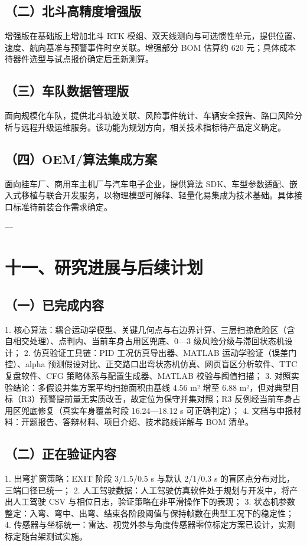 \documentclass[UTF8,11pt]{ctexart}
\begin{document}
\subsection*{（二）北斗高精度增强版}
增强版在基础版上增加北斗 RTK 模组、双天线测向与可选惯性单元，提供位置、速度、航向基准与预警事件时空关联。增强部分 BOM 估算约 620 元；具体成本待器件选型与试点报价确定后重新测算。

\subsection*{（三）车队数据管理版}
面向规模化车队，提供北斗轨迹关联、风险事件统计、车辆安全报告、路口风险分析与远程升级运维服务。该功能为规划方向，相关技术指标待产品定义确定。

\subsection*{（四）OEM/算法集成方案}
面向挂车厂、商用车主机厂与汽车电子企业，提供算法 SDK、车型参数适配、嵌入式移植与联合开发服务，以物理模型可解释、轻量化易集成为技术基础。具体接口标准待前装合作需求确定。

---

\section*{十一、研究进展与后续计划}
\subsection*{（一）已完成内容}
1. 核心算法：耦合运动学模型、关键几何点与右边界计算、三层扫掠危险区（含自相交处理）、点判内、当前车身占用区兜底、0—3 级风险分级与滞回状态机设计； 2. 仿真验证工具链：PID 工况仿真导出器、MATLAB 运动学验证（误差门控）、alpha 预测假设对比、正交路口出弯状态机仿真、网页盲区分析软件、TTC 复盘软件、CFG 策略体系与配置生成器、MATLAB 校验与阈值扫描； 3. 对照实验结论：多假设并集方案平均扫掠面积由基线 4.56 m² 增至 6.88 m²，但对典型目标（R3）预警提前量无实质改善，故定位为保守并集对照；R3 反例经当前车身占用区兜底修复（真实车身覆盖时段 16.24—18.12 s 可正确判定）； 4. 文档与申报材料：开题报告、答辩材料、项目介绍、技术路线详解与 BOM 清单。

\subsection*{（二）正在验证内容}
1. 出弯扩窗策略：EXIT 阶段 3/1.5/0.5 s 与默认 2/1/0.3 s 的盲区点分布对比，三端口径已统一； 2. 人工驾驶数据：人工驾驶仿真软件处于规划与开发中，将产出人工驾驶 CSV 与相位日志，验证策略在非平滑操作下的表现； 3. 状态机参数整定：入弯、弯中、出弯、结束各阶段阈值与保持帧数在典型工况下的稳定性； 4. 传感器与坐标统一：雷达、视觉外参与角度传感器零位标定方案已设计，实测标定随台架测试实施。
\end{document}

